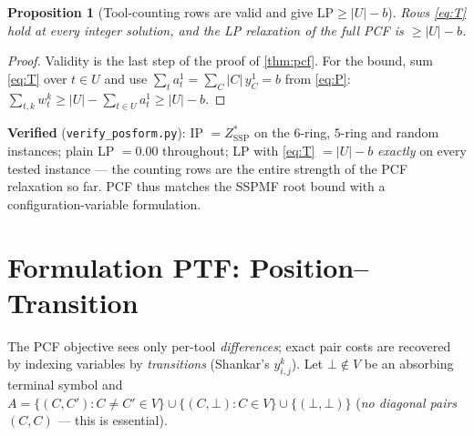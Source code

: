 \documentclass[11pt,a4paper]{article}
\theoremstyle{plain}
\newtheorem{proposition}[theorem]{Proposition}
\theoremstyle{definition}
\newcommand{\ZSSP}{Z_{\mathrm{SSP}}^{*}}
\begin{document}
\begin{thmbox}
\begin{proposition}[Tool-counting rows are valid and give $\mathrm{LP}\ge|U|-b$]
\label{prop:T}
Rows \eqref{eq:T} hold at every integer solution, and the LP relaxation of the full
PCF is $\ge|U|-b$.
\end{proposition}
\end{thmbox}
\begin{proofbox}
\begin{proof}
Validity is the last step of the proof of \cref{thm:pcf}. For the bound, sum
\eqref{eq:T} over $t\in U$ and use
$\sum_{t}a_t^1=\sum_C|C|\,y_C^1=b$ from \eqref{eq:P}:
$\sum_{t,k}w_t^k\ge|U|-\sum_{t\in U}a_t^1\ge|U|-b$.
\end{proof}
\end{proofbox}

\begin{warnbox}
\textbf{Verified} (\texttt{verify\_posform.py}): IP $=\ZSSP$ on the $6$-ring,
$5$-ring and random instances; plain LP $=0.00$ throughout; LP with \eqref{eq:T}
$=|U|-b$ \emph{exactly} on every tested instance --- the counting rows are the entire
strength of the PCF relaxation so far. PCF thus matches the SSPMF root bound with a
configuration-variable formulation.
\end{warnbox}

\section{Formulation PTF: Position--Transition}
\label{sec:ptf}

The PCF objective sees only per-tool \emph{differences}; exact pair costs are
recovered by indexing variables by \emph{transitions} (Shankar's $y_{i,j}^k$).
Let $\bot\notin V$ be an absorbing terminal symbol and
$A=\{(C,C'):C\ne C'\in V\}\cup\{(C,\bot):C\in V\}\cup\{(\bot,\bot)\}$
(\emph{no diagonal pairs} $(C,C)$ --- this is essential).
\end{document}
